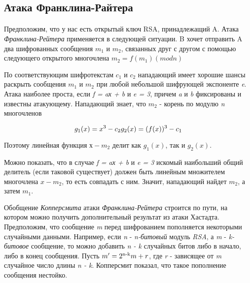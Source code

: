 \subsection{Атака Франклина-Райтера}

\paragraph{} Предположим, что у нас есть открытый ключ RSA, принадлежащий A. Атака \textit{Франклина-Рейтера} применяется в следующей ситуации. B хочет отправить A два шифрованных 
  сообщения \textit{{$m_1$}} и \textit{{$m_2$}}, связанных друг с другом с помощью следующего открытого многочлена \textit{{$ m_2 = f(m_1)(mod n) $}}
  
  По соответствующим шифротекстам \textit{{$c_1$}} и \textit{{$c_2$}} нападающий имеет хорошие шансы раскрыть сообщения \textit{{$m_1$}} и \textit{{$m_2$}} при любой небольшой
  шифрующей экспоненте \textit{e}. Атака наиболее проста, если \textit{f = aх + b} и \textit{e = 3}, причем \textit{a} и \textit{b} фиксированы и известны атакующему. 
  Нападающий знает, что \textit{{$m_2$}} - корень по модулю \textit{n} многочленов
  
    \begin{equation}
      \textit{{$ g_1(x) = x^3 - c_2 g_2(x) = (f(x))^3 - c_1 $}}
    \end{equation}

  Поэтому линейная функция \textit{{$х - m_2$}} делит как \textit{{$ g_1(x) $}}, так и \textit{{$ g_2(x) $}}.
  
  Можно показать, что в случае \textit{f = aх + b} и \textit{e = 3} искомый наибольший общий делитель (если таковой существует) должен быть линейным множителем 
  многочлена \textit{{$x - m_2$}}, то есть совпадать с ним. Значит, нападающий найдет \textit{{$m_2$}}, а затем \textit{{$m_1$}}.
  
  Обобщение \textit{Копперсмита} атаки \textit{Франклина-Рейтера} строится по пути, на котором можно получить дополнительный результат из атаки Хастадта. Предположим, что сообщение \textit{m} 
  перед шифрованием пополняется некоторыми случайными данными. Например, если \textit{n} - \textit{n-битовый} модуль \textit{RSA}, а \textit{m} - \textit{k-битовое} сообщение, 
  то можно добавить \textit{n - k} случайных битов либо в начало, либо в конец сообщения. Пусть \textit{{$ m' = 2\textsuperscript{n-k}m + r $}}, где \textit{r} - зависящее от 
  \textit{m} случайное число длины \textit{n - k}. Копперсмит показал, что такое пополнение сообщения нестойко.
  

